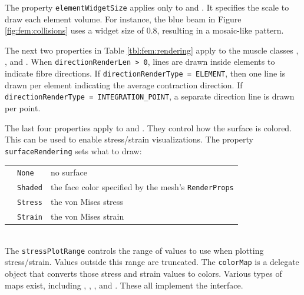 The property {\tt elementWidgetSize} applies only to 
 and
.  It specifies the scale to
draw each element volume.  For instance, the blue beam in Figure \ref{fig:fem:collisions}
uses a widget size of 0.8, resulting in a mosaic-like pattern.

The next two properties in Table \ref{tbl:fem:rendering} apply to the muscle classes 
, 
, and
.
When {\tt directionRenderLen > 0}, lines are drawn inside elements to indicate fibre
directions.  If {\tt directionRenderType = ELEMENT}, then one line is drawn per
element indicating the average contraction direction.  If 
{\tt directionRenderType = INTEGRATION\_POINT}, a separate direction line is drawn 
per point.

The last four properties apply to 
 and 
.
They control how the surface is colored.  This can be used to enable stress/strain
visualizations.  The property {\tt surfaceRendering} sets what to draw:\\
\medskip
\begin{tabular}{lll}
& {\tt None} & no surface\\
& {\tt Shaded} & the face color specified by the mesh's {\tt RenderProps}\\
& {\tt Stress} & the von Mises stress\\
& {\tt Strain} & the von Mises strain
\end{tabular}
\medskip\\
The {\tt stressPlotRange} controls the range of values to use when plotting 
stress/strain.  Values outside this range are truncated.  The {\tt colorMap}
is a delegate object that converts those stress and strain values to colors.
Various types of maps exist, including 
,
,
, and
.  These all implement the
 interface.

